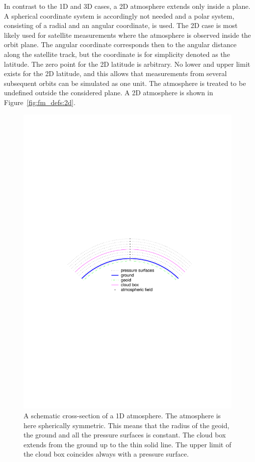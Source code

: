  In contrast to the 1D and 3D cases, a 2D
atmosphere extends only inside a plane. A spherical coordinate system
is accordingly not needed and a polar system, consisting of a radial
and an angular coordinate, is used. The 2D case is most likely used
for satellite measurements where the atmosphere is observed inside the
orbit plane. The angular coordinate corresponds then to the angular
distance along the satellite track, but the coordinate is for
simplicity denoted as the latitude. The zero point for the 2D latitude
is arbitrary. No lower and upper limit exists for the 2D latitude, and
this allows that measurements from several subsequent orbits can be
simulated as one unit. The atmosphere is treated to be undefined
outside the considered plane. A 2D atmosphere is shown in
Figure~\ref{fig:fm_defs:2d}.

 \begin{figure}[!t]
  \begin{center}
   \includegraphics*[width=0.95\hsize]{Figs/atm_dim_1d}
   \caption{ A schematic cross-section of a 1D atmosphere. The atmosphere is 
     here spherically symmetric. This means that the radius of the
     geoid, the ground and all the pressure surfaces is constant. The
     cloud box extends from the ground up to the thin solid line. The
     upper limit of the cloud box coincides always with a pressure
     surface.  }
   \label{fig:fm_defs:1d}  
  \end{center}
 \end{figure}


